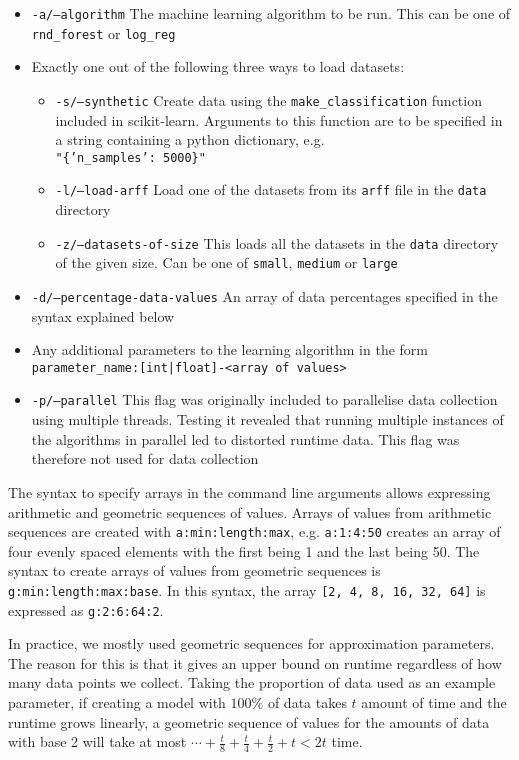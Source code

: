 \documentclass[a4paper,12pt,twoside,openright]{report}
\begin{document}
\begin{itemize}
\item \texttt{-a/--algorithm} The machine learning algorithm to be run. This can be one of \texttt{rnd\_forest} or \texttt{log\_reg}
\item Exactly one out of the following three ways to load datasets:
\begin{itemize}[label=$\star$]
        \item \texttt{-s/--synthetic} Create data using the \texttt{make\_classification} function included in scikit-learn. Arguments to this function are to be specified in a string containing a python dictionary, e.g. \\\texttt{"\{'n\_samples': 5000\}"}
        \item \texttt{-l/--load-arff} Load one of the datasets from its \texttt{arff} file in the \texttt{data} directory
        \item \texttt{-z/--datasets-of-size} This loads all the datasets in the \texttt{data} directory of the given size. Can be one of \texttt{small}, \texttt{medium} or \texttt{large}
     \end{itemize}
\item \texttt{-d/--percentage-data-values} An array of data percentages specified in the syntax explained below
\item Any additional parameters to the learning algorithm in the form \\\texttt{parameter\_name:[int|float]-<array of values>}
\item \texttt{-p/--parallel} This flag was originally included to parallelise data collection using multiple threads. Testing it revealed that running multiple instances of the algorithms in parallel led to distorted runtime data. This flag was therefore not used for data collection
\end{itemize}

The syntax to specify arrays in the command line arguments allows expressing arithmetic and geometric sequences of values. Arrays of values from arithmetic sequences are created with \texttt{a:min:length:max}, e.g. \texttt{a:1:4:50} creates an array of four evenly spaced elements with the first being 1 and the last being 50. The syntax to create arrays of values from geometric sequences is \texttt{g:min:length:max:base}. In this syntax, the array \texttt{[2, 4, 8, 16, 32, 64]} is expressed as \texttt{g:2:6:64:2}.

In practice, we mostly used geometric sequences for approximation parameters. The reason for this is that it gives an upper bound on runtime regardless of how many data points we collect. Taking the proportion of data used as an example parameter, if creating a model with $100\%$ of data takes $t$ amount of time and the runtime grows linearly, a geometric sequence of values for the amounts of data with base 2 will take at most $\cdots + \frac{t}{8} + \frac{t}{4} + \frac{t}{2} + t < 2t$ time.
\end{document}
